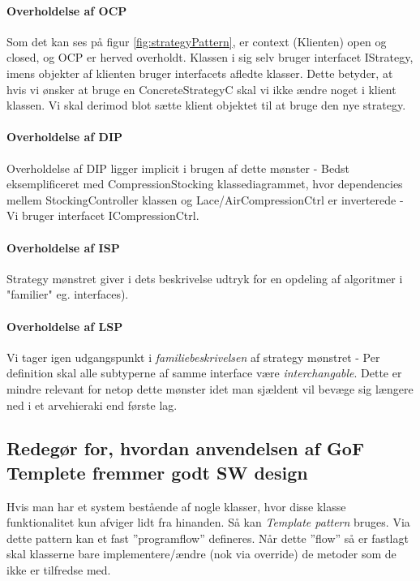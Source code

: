 \paragraph{Overholdelse af OCP}
Som det kan ses på figur \ref{fig:strategyPattern}, er context (Klienten) open og closed, og OCP er herved overholdt. Klassen i sig selv bruger interfacet IStrategy, imens objekter af klienten bruger interfacets afledte klasser. Dette betyder, at hvis vi ønsker at bruge en ConcreteStrategyC skal vi ikke ændre noget i klient klassen. Vi skal derimod blot sætte klient objektet til at bruge den nye strategy.

\paragraph{Overholdelse af DIP}
Overholdelse af DIP ligger implicit i brugen af dette mønster - Bedst eksemplificeret med CompressionStocking klassediagrammet, hvor dependencies mellem StockingController klassen og Lace/AirCompressionCtrl er inverterede - Vi bruger interfacet ICompressionCtrl.  

\paragraph{Overholdelse af ISP}
Strategy mønstret giver i dets beskrivelse udtryk for en opdeling af algoritmer i "familier" eg. interfaces).

\paragraph{Overholdelse af LSP}
Vi tager igen udgangspunkt i \textit{familiebeskrivelsen} af strategy mønstret - Per definition skal alle subtyperne af samme interface være \textit{interchangable}. Dette er mindre relevant for netop dette mønster idet man sjældent vil bevæge sig længere ned i et arvehieraki end første lag.

\subsection{Redegør for, hvordan anvendelsen af GoF Templete fremmer godt SW design}
Hvis man har et system bestående af nogle klasser, hvor disse klasse funktionalitet kun afviger lidt fra hinanden. Så kan \textit{Template pattern} bruges. Via dette pattern kan et fast ''programflow'' defineres. Når dette ''flow'' så er fastlagt skal klasserne bare implementere/ændre (nok via override) de metoder som de ikke er tilfredse med.

